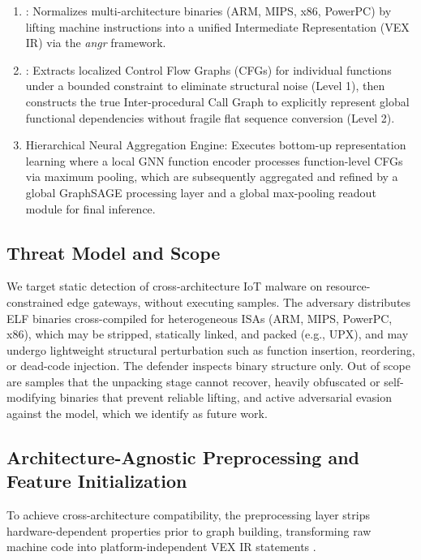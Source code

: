 \documentclass{llncs}
\begin{document}
\begin{enumerate}
    \item {}: Normalizes multi-architecture binaries (ARM, MIPS, x86, PowerPC) by lifting machine instructions into a unified Intermediate Representation (VEX IR) via the \textit{angr} framework.
    \item {}: Extracts localized Control Flow Graphs (CFGs) for individual functions under a bounded constraint to eliminate structural noise \cite{b6} (Level 1), then constructs the true Inter-procedural Call Graph to explicitly represent global functional dependencies without fragile flat sequence conversion (Level 2).
    \item Hierarchical Neural Aggregation Engine: Executes bottom-up representation learning where a local GNN function encoder processes function-level CFGs via maximum pooling, which are subsequently aggregated and refined by a global GraphSAGE processing layer and a global max-pooling readout module for final inference.
\end{enumerate}


\subsection{Threat Model and Scope}
We target static detection of cross-architecture IoT malware on resource-constrained edge gateways,
without executing samples. The adversary distributes ELF binaries cross-compiled for heterogeneous
ISAs (ARM, MIPS, PowerPC, x86), which may be stripped, statically linked, and packed (e.g., UPX), and
may undergo lightweight structural perturbation such as function insertion, reordering, or dead-code
injection. The defender inspects binary structure only. Out of scope are samples that the unpacking
stage cannot recover, heavily obfuscated or self-modifying binaries that prevent reliable lifting, and
active adversarial evasion against the model, which we identify as future work.


\subsection{Architecture-Agnostic Preprocessing and Feature Initialization}
To achieve cross-architecture compatibility, the preprocessing layer strips hardware-dependent properties prior to graph building, transforming raw machine code into platform-independent VEX IR statements \cite{b4}.
\end{document}
